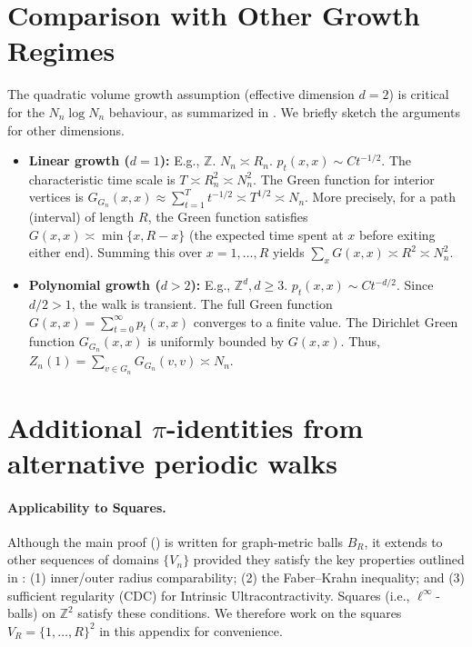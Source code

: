\documentclass{article}
\numberwithin{equation}{section}
\theoremstyle{definition}
\theoremstyle{remark}
\begin{document}
\appendix

\section{Comparison with Other Growth Regimes}\label{app:growth}
The quadratic volume growth assumption (effective dimension $d=2$) is critical for the $N_n \log N_n$ behaviour, as summarized in . We briefly sketch the arguments for other dimensions.

\begin{itemize}
\item \textbf{Linear growth ($d=1$):} E.g., $\mathbb{Z}$. $N_n \asymp R_n$. $p_t(x,x) \sim C t^{-1/2}$. The characteristic time scale is $T \asymp R_n^2 \asymp N_n^2$. The Green function for interior vertices is $G_{G_n}(x,x) \approx \sum_{t=1}^{T} t^{-1/2} \asymp T^{1/2} \asymp N_n$.
More precisely, for a path (interval) of length $R$, the Green function satisfies $G(x,x) \asymp \min\{x, R-x\}$ (the expected time spent at $x$ before exiting either end). Summing this over $x=1,\dots,R$ yields $\sum_x G(x,x) \asymp R^2 \asymp N_n^2$.

\item \textbf{Polynomial growth ($d>2$):} E.g., $\mathbb{Z}^d, d\geq 3$. $p_t(x,x) \sim C t^{-d/2}$. Since $d/2 > 1$, the walk is transient. The full Green function $G(x,x) = \sum_{t=0}^{\infty} p_t(x,x)$ converges to a finite value. The Dirichlet Green function $G_{G_n}(x,x)$ is uniformly bounded by $G(x,x)$. Thus, $Z_n(1) = \sum_{v \in G_n} G_{G_n}(v,v) \asymp N_n$.
\end{itemize}


\section{Additional $\pi$-identities from alternative periodic walks}
\label{app:alt_pi}

\paragraph{Applicability to Squares.}
Although the main proof () is written for graph-metric balls $B_R$, it extends to other sequences of domains $\{V_n\}$ provided they satisfy the key properties outlined in : (1) inner/outer radius comparability; (2) the Faber–Krahn inequality; and (3) sufficient regularity (CDC) for Intrinsic Ultracontractivity. Squares (i.e., $\ell^\infty$-balls) on $\mathbb{Z}^2$ satisfy these conditions. We therefore work on the squares $V_R=\{1,\dots,R\}^2$ in this appendix for convenience.
\medskip
\end{document}
